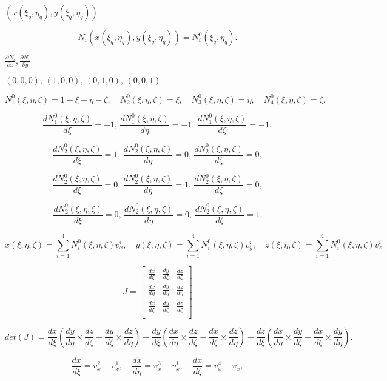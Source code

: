 \documentclass{article}
\begin{document}
$ (x(\xi_q, \eta_q), y(\xi_q,\eta_q)) $
\pagebreak

\[ N_i(x(\xi_q, \eta_q), y(\xi_q, \eta_q)) = N^0_i(\xi_q, \eta_q). \]
\pagebreak

$ \frac{\partial N_i}{\partial x}, \frac{\partial N_i}{\partial y}$
\pagebreak

$ (0,0,0), \, (1,0,0), \, (0,1,0), \, (0,0,1) $
\pagebreak

\[N^0_1(\xi, \eta, \zeta) = 1- \xi - \eta - \zeta, \quad N^0_2(\xi, \eta, \zeta) = \xi, \quad N^0_3(\xi, \eta, \zeta) = \eta, \quad N^0_4(\xi, \eta, \zeta) = \zeta. \]
\pagebreak

\[\frac{d N^0_1(\xi, \eta, \zeta)}{d\xi} = -1, \, \frac{d N^0_1(\xi, \eta, \zeta) }{d\eta} = -1, \, \frac{d N^0_1(\xi, \eta, \zeta) }{d\zeta} = -1, \]
\pagebreak

\[\frac{d N^0_2(\xi, \eta, \zeta)}{d\xi} = 1, \, \frac{d N^0_2(\xi, \eta, \zeta)}{d\eta} = 0, \, \frac{d N^0_2(\xi, \eta, \zeta)}{d\zeta} = 0, \]
\pagebreak

\[\frac{d N^0_2(\xi, \eta, \zeta)}{d\xi} = 0, \, \frac{d N^0_2(\xi, \eta, \zeta)}{d\eta} = 1, \, \frac{d N^0_2(\xi, \eta, \zeta)}{d\zeta} = 0, \]
\pagebreak

\[\frac{d N^0_2(\xi, \eta, \zeta)}{d\xi} = 0, \, \frac{d N^0_2(\xi, \eta, \zeta)}{d\eta} = 0, \, \frac{d N^0_2(\xi, \eta, \zeta)}{d\zeta} = 1. \]
\pagebreak

\[ x(\xi, \eta, \zeta) = \sum_{i=1}^4 N^0_i(\xi, \eta, \zeta) v^i_x, \quad y (\xi, \eta, \zeta) = \sum_{i=1}^4 N^0_i(\xi, \eta, \zeta) v^i_y, \quad z (\xi, \eta, \zeta) = \sum_{i=1}^4 N^0_i(\xi, \eta, \zeta) v^i_z \]
\pagebreak

\[ J = \left[ { \begin{array}{ccc} \frac{dx}{d\xi} &\frac{dy}{d\xi} &\frac{dz}{d\xi} \\ \frac{dx}{d\eta} & \frac{dy}{d\eta} &\frac{dz}{d\eta} \\ \frac{dx}{d\zeta} & \frac{dy}{d\zeta} &\frac{dz}{d\zeta} \\ \end{array} } \right] \]
\pagebreak

\[ det(J) = \frac{dx}{d\xi} (\frac{dy}{d\eta} \times \frac{dz}{d\zeta} - \frac{dy}{d\zeta}\times \frac{dz}{d\eta}) - \frac{dy}{d\xi} (\frac{dx}{d\eta} \times \frac{dz}{d\zeta} - \frac{dx}{d\zeta}\times \frac{dz}{d\eta}) + \frac{dz}{d\xi} (\frac{dx}{d\eta} \times \frac{dy}{d\zeta} - \frac{dx}{d\zeta}\times \frac{dy}{d\eta}). \]
\pagebreak

\[ \frac{dx}{d\xi} = v^2_x - v^1_x, \quad \frac{dx}{d\eta} = v^3_x - v^1_x, \quad \frac{dx}{d\zeta} = v^4_x - v^1_x, \]
\pagebreak
\end{document}
